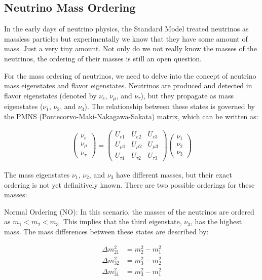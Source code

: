 \subsection{Neutrino Mass Ordering}

In the early days of neutrino physics, the Standard Model treated neutrinos as massless particles but experimentally we know that they have some amount of mass.
Just a very tiny amount.
Not only do we not really know the masses of the neutrinos, the ordering of their masses is still an open question.

For the mass ordering of neutrinos, we need to delve into the concept of neutrino mass eigenstates and flavor eigenstates.
Neutrinos are produced and detected in flavor eigenstates (denoted by $\nu_e$, $\nu_\mu$, and $\nu_\tau$), but they propagate as mass eigenstates ($\nu_1$, $\nu_2$, and $\nu_3$).
The relationship between these states is governed by the PMNS (Pontecorvo-Maki-Nakagawa-Sakata) matrix, which can be written as:

\begin{align}
  \begin{pmatrix}
    \nu_e \\
    \nu_\mu \\
    \nu_\tau
  \end{pmatrix}
  =
  \begin{pmatrix}
    U_{e1} & U_{e2} & U_{e3} \\
    U_{\mu1} & U_{\mu2} & U_{\mu3} \\
    U_{\tau1} & U_{\tau2} & U_{\tau3}
  \end{pmatrix}
  \begin{pmatrix}
    \nu_1 \\
    \nu_2 \\
    \nu_3
  \end{pmatrix}
\end{align}

The mass eigenstates $\nu_1$, $\nu_2$, and $\nu_3$ have different masses, but their exact ordering is not yet definitively known.
There are two possible orderings for these masses:

Normal Ordering (NO): In this scenario, the masses of the neutrinos are ordered as \( m_1 < m_2 < m_3 \).
This implies that the third eigenstate, $\nu_3$, has the highest mass.
The mass differences between these states are described by:

\begin{align}
  \Delta m_{21}^2 &= m_2^2 - m_1^2 \\
  \Delta m_{32}^2 &= m_3^2 - m_2^2 \\
  \Delta m_{31}^2 &= m_3^2 - m_1^2
\end{align}

